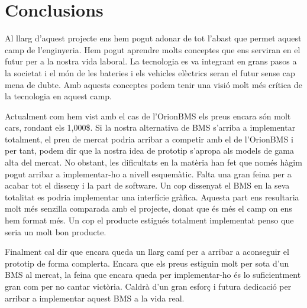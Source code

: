 \chapter{Conclusions}
\label{chap:Conclusions}


Al llarg d'aquest projecte ens hem pogut adonar de tot l'abast que permet aquest camp de l'enginyeria. Hem pogut aprendre molts conceptes que ens serviran en el futur per a la nostra vida laboral. La tecnologia es va integrant en grans pasos a la societat i el món de les bateries i els vehicles elèctrics seran el futur sense cap mena de dubte. Amb aquests conceptes podem tenir una visió molt més crítica de la tecnologia en aquest camp. 

Actualment com hem vist amb el cas de l'OrionBMS els preus encara són molt cars, rondant els 1,000\$. Si la nostra alternativa de BMS s'arriba a implementar totalment, el preu de mercat podria arribar a competir amb el de l'OrionBMS i per tant, podem dir que la nostra idea de prototip s'apropa als models de gama alta del mercat. No obstant, les dificultats en la matèria han fet que només hàgim pogut arribar a implementar-ho a nivell esquemàtic. Falta una gran feina per a acabar tot el disseny i la part de software. Un cop dissenyat el BMS en la seva totalitat es podria implementar una interfície gràfica. Aquesta part ens resultaria molt més senzilla comparada amb el projecte, donat que és més el camp on ens hem format més. Un cop el producte estigués totalment implementat penso que seria un molt bon producte. 

Finalment cal dir que encara queda un llarg camí per a arribar a aconseguir el prototip de forma complerta. Encara que els preus estiguin molt per sota d'un BMS al mercat, la feina que encara queda per implementar-ho és lo suficientment gran com per no cantar victòria. Caldrà d'un gran esforç i futura dedicació per arribar a implementar aquest BMS a la vida real.
